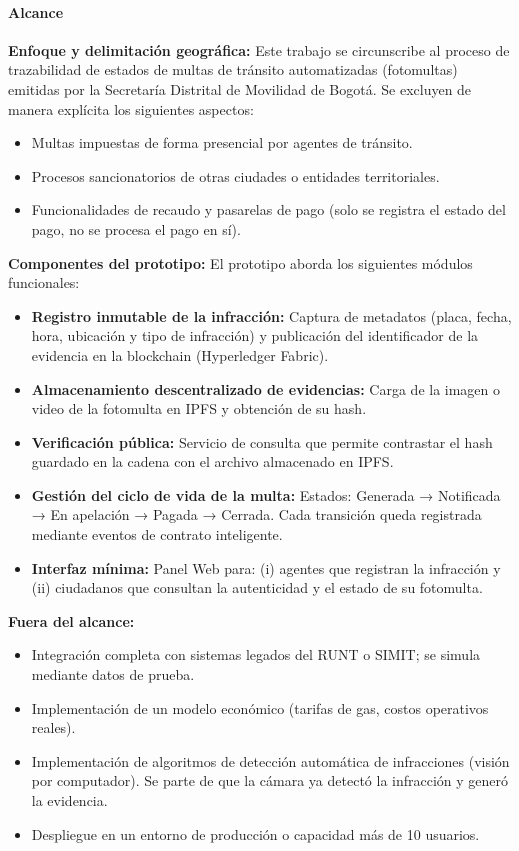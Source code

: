 \paragraph{Alcance}
\textbf{Enfoque y delimitación geográfica:} Este trabajo se circunscribe al proceso de trazabilidad de estados de multas de tránsito automatizadas (fotomultas) emitidas por la Secretaría Distrital de Movilidad de Bogotá. Se excluyen de manera explícita los siguientes aspectos:
\begin{itemize}
    \item Multas impuestas de forma presencial por agentes de tránsito.
    \item Procesos sancionatorios de otras ciudades o entidades territoriales.
    \item Funcionalidades de recaudo y pasarelas de pago (solo se registra el estado del pago, no se procesa el pago en sí).
\end{itemize}

\textbf{Componentes del prototipo:} El prototipo aborda los siguientes módulos funcionales:
\begin{itemize}
    \item \textbf{Registro inmutable de la infracción:} Captura de metadatos (placa, fecha, hora, ubicación y tipo de infracción) y publicación del identificador de la evidencia en la blockchain (Hyperledger Fabric).
    \item \textbf{Almacenamiento descentralizado de evidencias:} Carga de la imagen o video de la fotomulta en IPFS y obtención de su hash.
    \item \textbf{Verificación pública:} Servicio de consulta que permite contrastar el hash guardado en la cadena con el archivo almacenado en IPFS.
    \item \textbf{Gestión del ciclo de vida de la multa:} Estados: Generada → Notificada → En apelación → Pagada → Cerrada. Cada transición queda registrada mediante eventos de contrato inteligente.
    \item \textbf{Interfaz mínima:} Panel Web para: (i) agentes que registran la infracción y (ii) ciudadanos que consultan la autenticidad y el estado de su fotomulta.
\end{itemize}

\textbf{Fuera del alcance:}
\begin{itemize}
    \item Integración completa con sistemas legados del RUNT o SIMIT; se simula mediante datos de prueba.
    \item Implementación de un modelo económico (tarifas de gas, costos operativos reales).
    \item Implementación de algoritmos de detección automática de infracciones (visión por computador). Se parte de que la cámara ya detectó la infracción y generó la evidencia.
    \item Despliegue en un entorno de producción o capacidad más de 10 usuarios.
\end{itemize}

